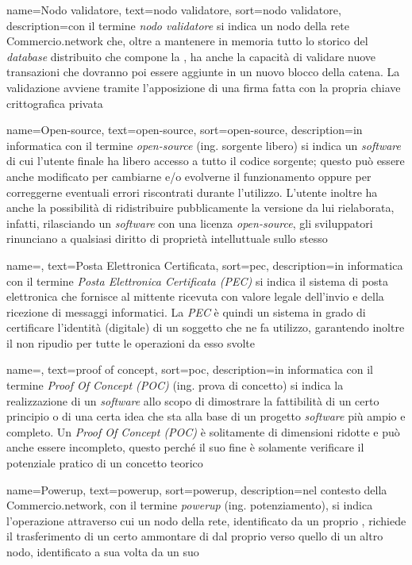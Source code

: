 {
	name=Nodo validatore,
	text=nodo validatore,
	sort=nodo validatore,
	description={con il termine \emph{nodo validatore} si indica un nodo della rete Commercio.network che, oltre a mantenere in memoria tutto lo storico del \textit{database} distribuito che compone la , ha anche la capacità di validare nuove transazioni che dovranno poi essere aggiunte in un nuovo blocco della catena. La validazione avviene tramite l'apposizione di una firma fatta con la propria chiave crittografica privata}
}

{
	name=Open-source,
	text=open-source,
	sort=open-source,
	description={in informatica con il termine \emph{open-source} (ing. sorgente libero) si indica un \textit{software} di cui l'utente finale ha libero accesso a tutto il codice sorgente; questo può essere anche modificato per cambiarne e/o evolverne il funzionamento oppure per correggerne eventuali errori riscontrati durante l'utilizzo. L'utente inoltre ha anche la possibilità di ridistribuire pubblicamente la versione da lui rielaborata, infatti, rilasciando un \textit{software} con una licenza \emph{open-source}, gli sviluppatori rinunciano a qualsiasi diritto di proprietà intelluttuale sullo stesso}
}

{
	name=,
	text=Posta Elettronica Certificata,
	sort=pec,
	description={in informatica con il termine \emph{Posta Elettronica Certificata (PEC)} si indica il sistema di posta elettronica che fornisce al mittente ricevuta con valore legale dell’invio e della ricezione di messaggi informatici. La \textit{PEC} è quindi un sistema in grado di certificare l'identità (digitale) di un soggetto che ne fa utilizzo, garantendo inoltre il non ripudio per tutte le operazioni da esso svolte}
}

{
	name=,
	text=proof of concept,
	sort=poc,
	description={in informatica con il termine \emph{Proof Of Concept (POC)} (ing. prova di concetto) si indica la realizzazione di un \textit{software} allo scopo di dimostrare la fattibilità di un certo principio o di una certa idea che sta alla base di un progetto \textit{software} più ampio e completo. Un \emph{Proof Of Concept (POC)} è solitamente di dimensioni ridotte e può anche essere incompleto, questo perché il suo fine è solamente verificare il potenziale pratico di un concetto teorico}
}

{
	name=Powerup,
	text=powerup,
	sort=powerup,
	description={nel contesto della Commercio.network, con il termine \emph{powerup} (ing. potenziamento), si indica l'operazione attraverso cui un nodo della rete, identificato da un proprio , richiede il trasferimento di un certo ammontare di  dal proprio  verso quello di un altro nodo, identificato a sua volta da un suo }
}

